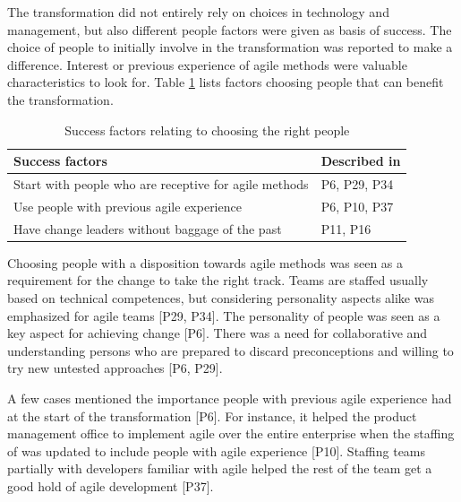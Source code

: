 \documentclass[preprint,authoryear,12pt]{elsarticle}
\begin{document}
The transformation did not entirely rely on choices in technology and
management, but also different people factors were given as basis of success.
The choice of people to initially involve in the transformation was reported to
make a difference. Interest or previous experience of agile methods were
valuable characteristics to look for.
Table \ref{table:success_people} lists factors choosing people that can benefit
the transformation.

\begin{table}[h]
    \centering
    \begin{tabular}{ ll }
        \toprule
        Success factors  &  Described in \\
        \midrule
        Start with people who are receptive for agile methods  &
                P6, P29, P34  \\
        Use people with previous agile experience  &
                P6, P10, P37  \\
        Have change leaders without baggage of the past  &
                P11, P16  \\
        \bottomrule
    \end{tabular}
    \caption{Success factors relating to choosing the right people}
    \label{table:success_people}
\end{table}

Choosing people with a disposition towards agile methods was seen as a
requirement for the change to take the right track. Teams are staffed usually
based on technical competences, but considering personality aspects alike was
emphasized for agile teams [P29, P34]. The personality of people was seen as a
key aspect for achieving change [P6]. There was a need for collaborative and
understanding persons who are prepared to discard preconceptions and willing to
try new untested approaches [P6, P29].


A few cases mentioned the importance people with previous agile experience had
at the start of the transformation [P6]. For instance, it helped the product
management office to implement agile over the entire enterprise when the
staffing of was updated to include people with agile experience [P10]. Staffing
teams partially with developers familiar with agile helped the rest of the team
get a good hold of agile development [P37].
\end{document}
